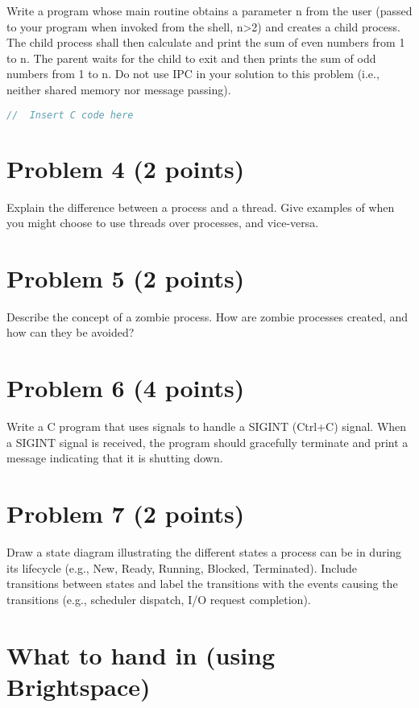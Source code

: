 \documentclass{article}
\begin{document}
Write a program whose main routine obtains a parameter n from the user (passed to your program when invoked from the shell, n>2) and creates a child process. The child process shall then calculate and print the sum of even numbers from 1 to n. The parent waits for the child to exit and then prints the sum of odd numbers from 1 to n. Do not use IPC in your solution to this problem (i.e., neither shared memory nor message passing).

\begin{lstlisting}[language=C, caption=Example C Code, basicstyle=\ttfamily\footnotesize]
//  Insert C code here
\end{lstlisting}


\section*{Problem 4 (2 points)}

Explain the difference between a process and a thread.  Give examples of when you might choose to use threads over processes, and vice-versa.


\section*{Problem 5 (2 points)}

Describe the concept of a zombie process. How are zombie processes created, and how can they be avoided?


\section*{Problem 6 (4 points)}

Write a C program that uses signals to handle a SIGINT (Ctrl+C) signal. When a SIGINT signal is received, the program should gracefully terminate and print a message indicating that it is shutting down.


\section*{Problem 7 (2 points)}

Draw a state diagram illustrating the different states a process can be in during its lifecycle (e.g., New, Ready, Running, Blocked, Terminated).  Include transitions between states and label the transitions with the events causing the transitions (e.g., scheduler dispatch, I/O request completion).


\section*{What to hand in (using Brightspace)}
\end{document}
